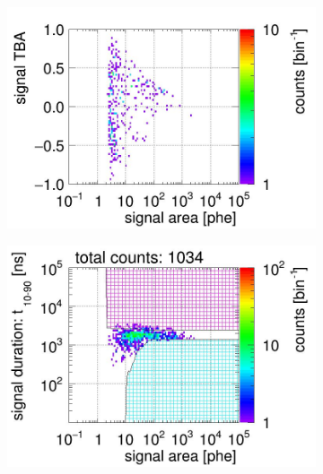\begin{landscape}
\begin{figure}[!p]
\begin{subfigure}[t]{0.32\textwidth}
		\includegraphics[width=\figurewidth,clip,trim={0 8 0 40}]{Figures/GasTest/CutsValid/res64767/tbapaX15Vecfig64767.jpg}
		\caption{}
		\label{fig:signal selection 15}
	\end{subfigure}
	\begin{subfigure}[t]{0.32\textwidth}
	\centering
	\includegraphics[width=\figurewidth,clip,trim={0 98 0 15}]{Figures/GasTest/CutsValid/res64767/pdpa16Vecfig64767.jpg}

\end{subfigure}
\end{figure}
\end{landscape}
